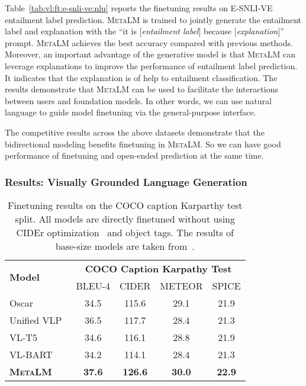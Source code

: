 \documentclass{article}
\theoremstyle{plain}
\theoremstyle{definition}
\theoremstyle{remark}
\newcommand\ours{\textsc{MetaLM}}
\begin{document}
Table~\ref{tab:vl:ft:e-snli-ve:nlu} reports the finetuning results on E-SNLI-VE entailment label prediction.
\ours{} is trained to jointly generate the entailment label and explanation with the ``it is [\textit{entailment label}] because [\textit{explanation}]'' prompt.
\ours{} achieves the best accuracy compared with previous methods.
Moreover, an important advantage of the generative model is that \ours{} can leverage explanations to improve the performance of entailment label prediction.
It indicates that the explanation is of help to entailment classification.
The results demonstrate that \ours{} can be used to facilitate the interactions between users and foundation models.
In other words, we can use natural language to guide model finetuning via the general-purpose interface.

The competitive results across the above datasets demonstrate that the bidirectional modeling benefits finetuning in \ours{}.
So we can have good performance of finetuning and open-ended prediction at the same time.


\subsubsection{Results: Visually Grounded Language Generation}

\begin{table}[t]
\centering
\begin{tabular}{@{}lcccc@{}}
\toprule
\multirow{2}{*}{\textbf{Model}} & \multicolumn{4}{c}{\textbf{COCO Caption Karpathy Test}} \\ \cmidrule(l){2-5} 
 &  BLEU-4 & CIDER & METEOR & SPICE \\
\midrule
Oscar~\citep{li2020oscar} & 34.5 & 115.6 & 29.1 & 21.9 \\
Unified VLP~\citep{zhou2020unified} & 36.5 & 117.7 & 28.4 & 21.3 \\
VL-T5~\citep{cho2021unifying} & 34.6 & 116.1 & 28.8 & 21.9 \\
VL-BART~\citep{cho2021unifying} & 34.2 & 114.1 & 28.4 & 21.3 \\
\textbf{\ours{}} & \textbf{37.6} & \textbf{126.6} & \textbf{30.0} & \textbf{22.9} \\ \bottomrule
\end{tabular}
\caption{Finetuning results on the COCO caption Karparthy test split. All models are directly finetuned without using CIDEr optimization~\citep{rennie2017self} and object tags. The results of base-size models are taken from~\citep{cho2021unifying}.
}
\label{tab:vl:ft:coco-caption}
\end{table}
\end{document}
